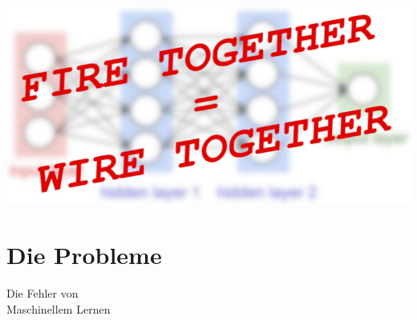 \documentclass[aspectratio=169,x11names]{beamer}
\begin{document}
\begin{frame}
\begin{center}
\includegraphics[width=\textwidth]{images/simple_neural_network_header_FW.jpg} 
\end{center}
\end{frame}



\section{Die Probleme}

\begin{frame}
\begin{center}
\huge
Die Fehler von\\Maschinellem Lernen
\end{center}
\end{frame}
\end{document}
